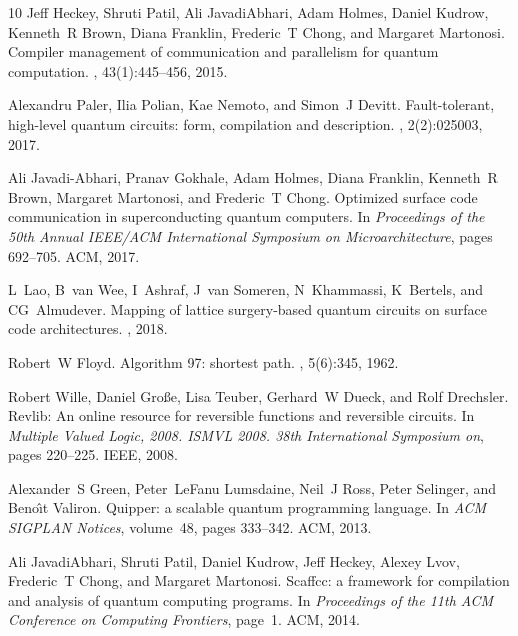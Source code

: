 \documentclass[journal,10pt,twocolumn]{IEEEtran}
\begin{document}
\begin{thebibliography}{10}
Jeff Heckey, Shruti Patil, Ali JavadiAbhari, Adam Holmes, Daniel Kudrow,
  Kenneth~R Brown, Diana Franklin, Frederic~T Chong, and Margaret Martonosi.
\newblock Compiler management of communication and parallelism for quantum
  computation.
, 43(1):445--456, 2015.

Alexandru Paler, Ilia Polian, Kae Nemoto, and Simon~J Devitt.
\newblock Fault-tolerant, high-level quantum circuits: form, compilation and
  description.
, 2(2):025003, 2017.

Ali Javadi-Abhari, Pranav Gokhale, Adam Holmes, Diana Franklin, Kenneth~R
  Brown, Margaret Martonosi, and Frederic~T Chong.
\newblock Optimized surface code communication in superconducting quantum
  computers.
\newblock In {\em Proceedings of the 50th Annual IEEE/ACM International
  Symposium on Microarchitecture}, pages 692--705. ACM, 2017.

L~Lao, B~van Wee, I~Ashraf, J~van Someren, N~Khammassi, K~Bertels, and
  CG~Almudever.
\newblock Mapping of lattice surgery-based quantum circuits on surface code
  architectures.
, 2018.

Robert~W Floyd.
\newblock Algorithm 97: shortest path.
, 5(6):345, 1962.

Robert Wille, Daniel Gro{\ss}e, Lisa Teuber, Gerhard~W Dueck, and Rolf
  Drechsler.
\newblock Revlib: An online resource for reversible functions and reversible
  circuits.
\newblock In {\em Multiple Valued Logic, 2008. ISMVL 2008. 38th International
  Symposium on}, pages 220--225. IEEE, 2008.

Alexander~S Green, Peter~LeFanu Lumsdaine, Neil~J Ross, Peter Selinger, and
  Beno{\^\i}t Valiron.
\newblock Quipper: a scalable quantum programming language.
\newblock In {\em ACM SIGPLAN Notices}, volume~48, pages 333--342. ACM, 2013.

Ali JavadiAbhari, Shruti Patil, Daniel Kudrow, Jeff Heckey, Alexey Lvov,
  Frederic~T Chong, and Margaret Martonosi.
\newblock Scaffcc: a framework for compilation and analysis of quantum
  computing programs.
\newblock In {\em Proceedings of the 11th ACM Conference on Computing
  Frontiers}, page~1. ACM, 2014.


\end{thebibliography}
\end{document}

